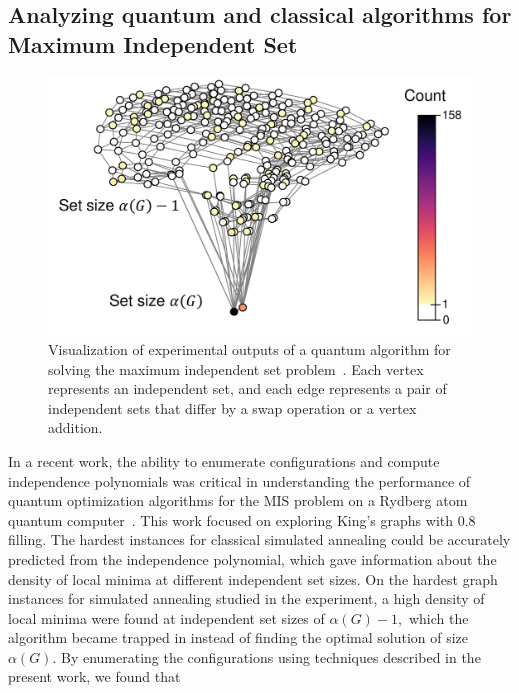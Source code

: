 \documentclass[review, onefignum, onetabnum]{siamart190516}
\begin{document}
\subsection{Analyzing quantum and classical algorithms for Maximum Independent Set}
\begin{figure} 
    \centering
    \includegraphics[width=.65\textwidth, trim={0cm 0cm 0cm 0cm}, clip]{figures/exp_configurations.pdf}
    \caption{Visualization of experimental outputs of a quantum algorithm for solving the maximum independent set problem~\cite{Ebadi2022}.
    Each vertex represents an independent set, and each edge represents a pair of independent sets that differ by a swap operation or a vertex addition.}
    \label{fig:exp_configuratoins}
\end{figure}
In a recent work, 
the ability to enumerate configurations and compute independence polynomials was critical in understanding the performance of quantum optimization algorithms for the MIS problem on a Rydberg atom quantum computer~\cite{Ebadi2022}. This work focused on 
exploring King's graphs with $0.8$ filling.   The hardest instances for classical simulated annealing could be accurately predicted from the independence polynomial, which gave information about the density of local minima at different independent set sizes.
On the hardest graph instances for simulated annealing studied in the experiment, a high density of local minima were found at independent set sizes of $\alpha(G)-1,$ which the algorithm became trapped in instead of finding the optimal solution of size $\alpha(G)$.
By enumerating the configurations using techniques described in the present work, we found that %
\end{document}

